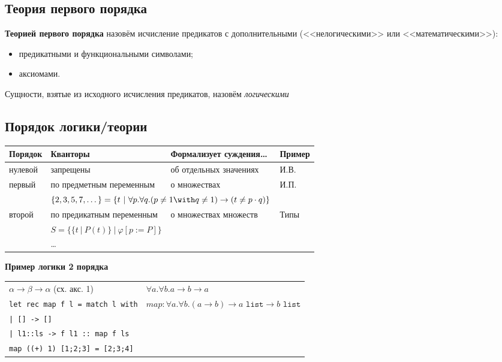 \subsection{Теория первого порядка}

\textbf{Теорией первого порядка} назовём исчисление предикатов с дополнительными (<<нелогическими>>
или <<математическими>>):
\begin{itemize}
\item предикатными и функциональными символами;
\item аксиомами.
\end{itemize}

Сущности, взятые из исходного исчисления предикатов, назовём \emph{логическими}

\subsection{Порядок логики/теории}

\begin{tabular}{llll}
Порядок & Кванторы & Формализует суждения\dots & Пример\\\hline
нулевой & запрещены & об отдельных значениях & И.В.\\
первый & по предметным переменным & о множествах & И.П.\\
    &   \multicolumn{2}{l}{\color{olive}$\{2,3,5,7,\dots\} = \{ t\ |\ \forall p.\forall q.(p \ne 1 \with q \ne 1) \rightarrow (t \ne p\cdot q)\}$}\\
второй & по предикатным переменным & о множествах множеств & Типы\\
    &   \multicolumn{2}{l}{\color{olive}$S = \{ \{t\ |\ P(t)\}\ |\ \varphi[p := P] \}$}\\
 & \dots 
\end{tabular}

\textbf{Пример логики 2 порядка}

\begin{tabular}{ll}
$\alpha\rightarrow\beta\rightarrow\alpha$ (сх. акс. 1) & $\forall a.\forall b.a \rightarrow b \rightarrow a$ \vspace{0.1cm}\\
\texttt{let rec map f l = match l with} & $map: \forall a.\forall b.(a \rightarrow b) \rightarrow a\texttt{ list} \rightarrow b\texttt{ list}$ \\
\texttt{| [] -> []} \\
\texttt{| l1::ls -> f l1 :: map f ls}\vspace{0.1cm}\\
\texttt{map ((+) 1) [1;2;3] = [2;3;4]}
\end{tabular}


